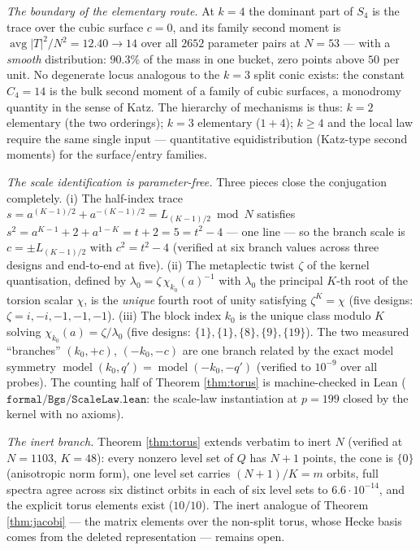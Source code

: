 \emph{The boundary of the elementary route.}  At $k=4$ the dominant part of
$S_4$ is the trace over the cubic surface $c=0$, and its family second moment
is $\operatorname{avg}|T|^2/N^2=12.40\to14$ over all $2652$ parameter pairs at
$N=53$ --- with a \emph{smooth} distribution: $90.3\%$ of the mass in one
bucket, zero points above $50$ per unit.  No degenerate locus analogous to
the $k=3$ split conic exists: the constant $C_4=14$ is the bulk second moment
of a family of cubic surfaces, a monodromy quantity in the sense of Katz.
The hierarchy of mechanisms is thus:
$k=2$ elementary (the two orderings); $k=3$ elementary ($1+4$); $k\ge4$ and
the local law require the same single input --- quantitative equidistribution
(Katz-type second moments) for the surface/entry families.

\emph{The scale identification is parameter-free.}  Three pieces close the
conjugation completely.  (i) The half-index trace
$s=a^{(K-1)/2}+a^{-(K-1)/2}=L_{(K-1)/2}\bmod N$ satisfies
$s^2=a^{K-1}+2+a^{1-K}=t+2=5=t^2-4$ --- one line --- so the branch scale is
$c=\pm L_{(K-1)/2}$ with $c^2=t^2-4$ (verified at six branch values across
three designs and end-to-end at five).  (ii) The metaplectic twist
$\zeta$ of the kernel quantisation, defined by
$\lambda_0=\zeta\,\chi_{k_0}(a)^{-1}$ with $\lambda_0$ the principal $K$-th
root of the torsion scalar $\chi$, is the \emph{unique} fourth root of unity
satisfying $\zeta^K=\chi$ (five designs: $\zeta=i,-i,-1,-1,-1$).  (iii) The
block index $k_0$ is the unique class modulo $K$ solving
$\chi_{k_0}(a)=\zeta/\lambda_0$ (five designs: $\{1\},\{1\},\{8\},\{9\},
\{19\}$).  The two measured ``branches'' $(k_0,+c)$, $(-k_0,-c)$ are one
branch related by the exact model symmetry
$\operatorname{model}(k_0,q')=\operatorname{model}(-k_0,-q')$ (verified to
$10^{-9}$ over all probes).  The counting half of Theorem \ref{thm:torus} is
machine-checked in Lean ($\texttt{formal/Bgs/ScaleLaw.lean}$: the scale-law
instantiation at $p=199$ closed by the kernel with no axioms).

\emph{The inert branch.}  Theorem \ref{thm:torus} extends verbatim to
inert $N$ (verified at $N=1103$, $K=48$): every nonzero level set of $Q$ has
$N+1$ points, the cone is $\{0\}$ (anisotropic norm form), one level set
carries $(N+1)/K=m$ orbits, full spectra agree across six distinct orbits in
each of six level sets to $6.6\cdot10^{-14}$, and the explicit torus
elements exist ($10/10$).  The inert analogue of Theorem
\ref{thm:jacobi} --- the matrix elements over the non-split torus, whose
Hecke basis comes from the deleted representation --- remains open.
